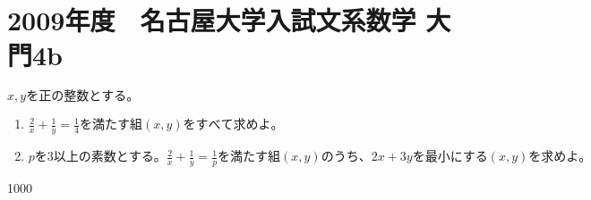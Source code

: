 \documentclass{jsarticle}
\begin{document}
\section*{2009年度　名古屋大学入試文系数学 大門4b}
$ x,yを正の整数とする。$
\begin{enumerate}[(1)]
\item $\frac{2}{x} + \frac{1}{y} = \frac{1}{4}　を満たす組(x,y)をすべて求めよ。$
\item $pを3以上の素数とする。\frac{2}{x} + \frac{1}{y} = \frac{1}{p} を満たす組(x,y)のうち、2x+3yを最小にする(x,y)を求めよ。$
\end{enumerate}





1000
\end{document}
